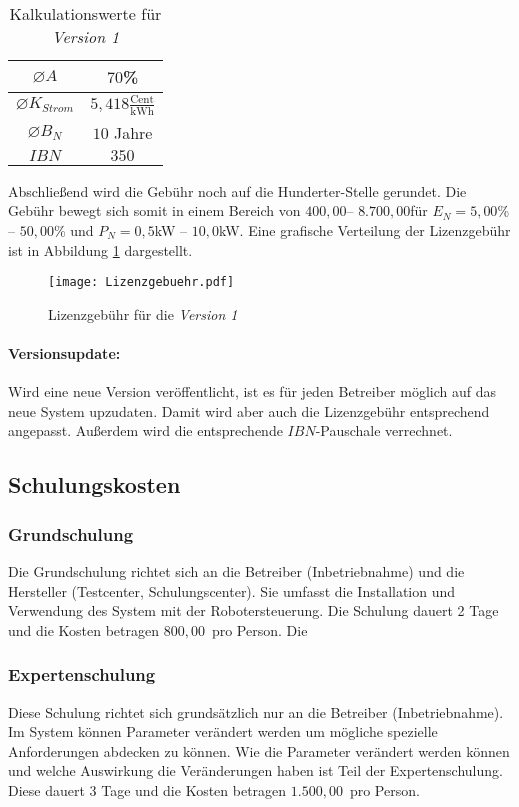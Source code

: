 \begin{table}[h]
	\centering
	\begin{tabular}{|c|c|}
		\hline 
		$\varnothing A$ & $70$\% \\ 
		\hline 
		$\varnothing K_{Strom}$ & $5,418\frac{\text{Cent}}{\text{kWh}}$ \\ 
		\hline
		$\varnothing B_N$ & $10$ Jahre \\ 
		\hline 
		$IBN$ & $350$\officialeuro \\ 
		\hline 
	\end{tabular}
	\caption{Kalkulationswerte für \textit{Version 1}}
	\label{tab:Kalkulationswerte}
\end{table}
Abschließend wird die Gebühr noch auf die Hunderter-Stelle gerundet. Die Gebühr bewegt sich somit in einem Bereich von $400,00$\officialeuro -- $8.700,00$\officialeuro für $E_N = 5,00$\% -- $50,00$\% und $P_N = 0,5$kW -- $10,0$kW. Eine grafische Verteilung der Lizenzgebühr ist in Abbildung \ref{fig:lizenzgebuehr} dargestellt.

\begin{figure}[h]
	\centering
	\texttt{[image: Lizenzgebuehr.pdf]}
	\caption{Lizenzgebühr für die \textit{Version 1}}
	\label{fig:lizenzgebuehr}
\end{figure}

\paragraph*{Versionsupdate:}
Wird eine neue Version veröffentlicht, ist es für jeden Betreiber möglich auf das neue System upzudaten. Damit wird aber auch die Lizenzgebühr entsprechend angepasst. Außerdem wird die entsprechende $IBN$-Pauschale verrechnet.

\subsection{Schulungskosten}
\subsubsection{Grundschulung}
Die Grundschulung richtet sich an die Betreiber (Inbetriebnahme) und die Hersteller (Testcenter, Schulungscenter). Sie umfasst die Installation und Verwendung des System mit der Robotersteuerung. Die Schulung dauert 2 Tage und die Kosten betragen $800,00$\officialeuro~pro Person. Die 

\subsubsection{Expertenschulung}
Diese Schulung richtet sich grundsätzlich nur an die Betreiber (Inbetriebnahme). Im System können Parameter verändert werden um mögliche spezielle Anforderungen abdecken zu können. Wie die Parameter verändert werden können und welche Auswirkung die Veränderungen haben ist Teil der Expertenschulung. Diese dauert 3 Tage und die Kosten betragen $1.500,00$\officialeuro~pro Person.

